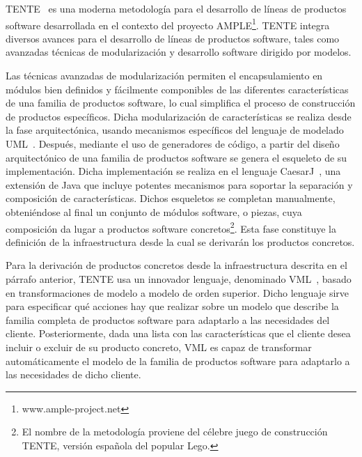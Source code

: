
TENTE~\cite{fuentes:2009:caise,sanchez:2011:tente} es una moderna metodología para el desarrollo de líneas de productos software desarrollada en el contexto del proyecto AMPLE\footnote{www.ample-project.net}. TENTE integra diversos avances para el desarrollo de líneas de productos software, tales como avanzadas técnicas de modularización y desarrollo software dirigido por modelos.

Las técnicas avanzadas de modularización permiten el encapsulamiento en módulos bien definidos y fácilmente componibles de las diferentes características de una familia de productos software, lo cual simplifica el proceso de construcción de productos específicos. Dicha modularización de características se realiza desde la fase arquitectónica, usando mecanismos específicos del lenguaje de modelado UML~\cite{uml:2005}. Después, mediante el uso de generadores de código, a partir del diseño arquitectónico de una familia de productos software se genera el esqueleto de su implementación. Dicha implementación se realiza en el lenguaje CaesarJ~\cite{aracic:2006}, una extensión de Java que incluye potentes mecanismos para soportar la separación y composición de características. Dichos esqueletos se completan manualmente, obteniéndose al final un conjunto de módulos software, o piezas, cuya composición da lugar a productos software concretos\footnote{El nombre de la metodología proviene del célebre juego de construcción TENTE, versión española del popular Lego.}. Esta fase constituye la definición de la infraestructura desde la cual se derivarán los productos concretos.

Para la derivación de productos concretos desde la infraestructura descrita en el párrafo anterior, TENTE usa
un innovador lenguaje, denominado VML~\cite{loughran:2008,sanchez:2008}, basado en transformaciones de modelo a modelo de orden superior. Dicho lenguaje sirve para especificar qué acciones hay que realizar sobre un modelo que describe la familia completa de productos software para adaptarlo a las necesidades del cliente. Posteriormente, dada una lista con las características que el cliente desea incluir o excluir de su producto concreto, VML es capaz de transformar automáticamente el modelo de la familia de productos software para adaptarlo a las necesidades de dicho cliente.

